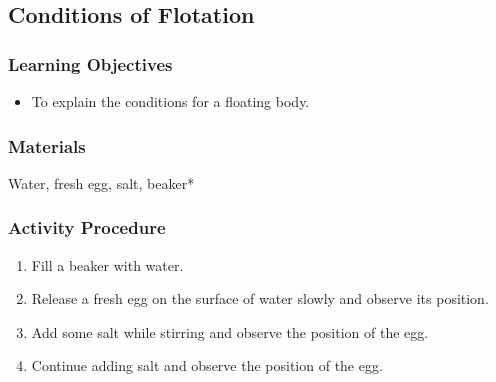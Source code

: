 


\subsection{Conditions of Flotation}

\subsubsection*{Learning Objectives}
\begin{itemize}
\item{To explain the conditions for a floating body.} 
\end{itemize}

\subsubsection*{Materials}
Water, fresh egg, salt, beaker*

\subsubsection*{Activity Procedure}
\begin{enumerate}
\item{Fill a beaker with water.} 
\item{Release a fresh egg on the surface of water slowly and observe its position.} 
\item{Add some salt while stirring and observe the position of the egg.} 
\item{Continue adding salt and observe the position of the egg.} 
\end{enumerate}


